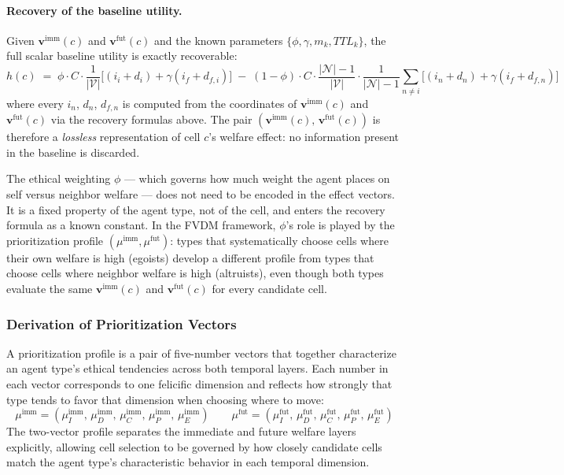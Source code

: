 \documentclass{icsthesis}
\begin{document}
\begin{mainmatter}
\paragraph{Recovery of the baseline utility.}
Given $\mathbf{v}^{\mathrm{imm}}(c)$ and $\mathbf{v}^{\mathrm{fut}}(c)$ and the known parameters $\{\phi, \gamma, m_k, TTL_k\}$, the full scalar baseline utility is exactly recoverable:
\[
h(c) \;=\; \phi \cdot C \cdot \frac{1}{|\mathcal{V}|}\bigl[(i_i + d_i) + \gamma(i_f + d_{f,i})\bigr]
\;-\; (1-\phi) \cdot C \cdot \frac{|\mathcal{N}|-1}{|\mathcal{V}|} \cdot \frac{1}{|\mathcal{N}|-1}\sum_{n \neq i}\bigl[(i_n + d_n) + \gamma(i_f + d_{f,n})\bigr]
\]
where every $i_n$, $d_n$, $d_{f,n}$ is computed from the coordinates of $\mathbf{v}^{\mathrm{imm}}(c)$ and $\mathbf{v}^{\mathrm{fut}}(c)$ via the recovery formulas above. The pair $(\mathbf{v}^{\mathrm{imm}}(c),\, \mathbf{v}^{\mathrm{fut}}(c))$ is therefore a \emph{lossless} representation of cell $c$’s welfare effect: no information present in the baseline is discarded.

The ethical weighting $\phi$ --- which governs how much weight the agent places on self versus neighbor welfare --- does not need to be encoded in the effect vectors. It is a fixed property of the agent type, not of the cell, and enters the recovery formula as a known constant. In the FVDM framework, $\phi$’s role is played by the prioritization profile $(\mu^{\mathrm{imm}}, \mu^{\mathrm{fut}})$: types that systematically choose cells where their own welfare is high (egoists) develop a different profile from types that choose cells where neighbor welfare is high (altruists), even though both types evaluate the same $\mathbf{v}^{\mathrm{imm}}(c)$ and $\mathbf{v}^{\mathrm{fut}}(c)$ for every candidate cell.


\subsubsection{Derivation of Prioritization Vectors}
\label{sec:derivation_of_vectors}
A prioritization profile is a pair of five-number vectors that together characterize an agent type’s ethical tendencies across both temporal layers. Each number in each vector corresponds to one felicific dimension and reflects how strongly that type tends to favor that dimension when choosing where to move:
\[
\mu^{\mathrm{imm}} = (\mu^{\mathrm{imm}}_I,\, \mu^{\mathrm{imm}}_D,\, \mu^{\mathrm{imm}}_C,\, \mu^{\mathrm{imm}}_P,\, \mu^{\mathrm{imm}}_E)
\qquad
\mu^{\mathrm{fut}} = (\mu^{\mathrm{fut}}_I,\, \mu^{\mathrm{fut}}_D,\, \mu^{\mathrm{fut}}_C,\, \mu^{\mathrm{fut}}_P,\, \mu^{\mathrm{fut}}_E)
\]
The two-vector profile separates the immediate and future welfare layers explicitly, allowing cell selection to be governed by how closely candidate cells match the agent type’s characteristic behavior in each temporal dimension.


\end{mainmatter}
\end{document}
